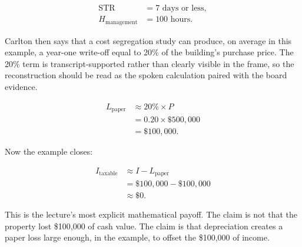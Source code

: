 \begin{align}
\mathrm{STR} &= 7\text{ days or less},\\
H_{\mathrm{management}} &= 100\text{ hours}.
\end{align}

Carlton then says that a cost segregation study can produce, on average in this example, a year-one write-off equal to 20\% of the building's purchase price. The 20\% term is transcript-supported rather than clearly visible in the frame, so the reconstruction should be read as the spoken calculation paired with the board evidence.

\begin{align}
L_{\mathrm{paper}}
&\approx 20\%\times P\\
&=0.20\times \$500{,}000\\
&=\$100{,}000.
\end{align}

Now the example closes:

\begin{align}
I_{\mathrm{taxable}}
&\approx I-L_{\mathrm{paper}}\\
&=\$100{,}000-\$100{,}000\\
&\approx \$0.
\end{align}

This is the lecture's most explicit mathematical payoff. The claim is not that the property lost \$100,000 of cash value. The claim is that depreciation creates a paper loss large enough, in the example, to offset the \$100,000 of income.

